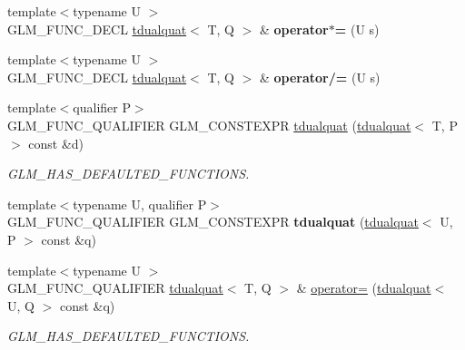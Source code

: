 \begin{DoxyCompactItemize}
{\footnotesize template$<$typename U $>$ }\\G\+L\+M\+\_\+\+F\+U\+N\+C\+\_\+\+D\+E\+CL \hyperlink{structglm_1_1tdualquat}{tdualquat}$<$ T, Q $>$ \& {\bfseries operator$\ast$=} (U s)
\item 
\mbox{\label{structglm_1_1tdualquat_a608f6681fbff3ab120235c75aac8805b}} 
{\footnotesize template$<$typename U $>$ }\\G\+L\+M\+\_\+\+F\+U\+N\+C\+\_\+\+D\+E\+CL \hyperlink{structglm_1_1tdualquat}{tdualquat}$<$ T, Q $>$ \& {\bfseries operator/=} (U s)
\item 
\mbox{\label{structglm_1_1tdualquat_a9dbf71289809c7b43527c0e881601fbb}} 
{\footnotesize template$<$qualifier P$>$ }\\G\+L\+M\+\_\+\+F\+U\+N\+C\+\_\+\+Q\+U\+A\+L\+I\+F\+I\+ER G\+L\+M\+\_\+\+C\+O\+N\+S\+T\+E\+X\+PR \hyperlink{structglm_1_1tdualquat_a9dbf71289809c7b43527c0e881601fbb}{tdualquat} (\hyperlink{structglm_1_1tdualquat}{tdualquat}$<$ T, P $>$ const \&d)
\begin{DoxyCompactList}\small\item\em G\+L\+M\+\_\+\+H\+A\+S\+\_\+\+D\+E\+F\+A\+U\+L\+T\+E\+D\+\_\+\+F\+U\+N\+C\+T\+I\+O\+NS. \end{DoxyCompactList}\item 
\mbox{\label{structglm_1_1tdualquat_a00f0899c1213aa991a65dfaf8d15fba5}} 
{\footnotesize template$<$typename U, qualifier P$>$ }\\G\+L\+M\+\_\+\+F\+U\+N\+C\+\_\+\+Q\+U\+A\+L\+I\+F\+I\+ER G\+L\+M\+\_\+\+C\+O\+N\+S\+T\+E\+X\+PR {\bfseries tdualquat} (\hyperlink{structglm_1_1tdualquat}{tdualquat}$<$ U, P $>$ const \&q)
\item 
\mbox{\label{structglm_1_1tdualquat_a6bdd31159c6bf9d7bca75971c2a1e512}} 
{\footnotesize template$<$typename U $>$ }\\G\+L\+M\+\_\+\+F\+U\+N\+C\+\_\+\+Q\+U\+A\+L\+I\+F\+I\+ER \hyperlink{structglm_1_1tdualquat}{tdualquat}$<$ T, Q $>$ \& \hyperlink{structglm_1_1tdualquat_a6bdd31159c6bf9d7bca75971c2a1e512}{operator=} (\hyperlink{structglm_1_1tdualquat}{tdualquat}$<$ U, Q $>$ const \&q)
\begin{DoxyCompactList}\small\item\em G\+L\+M\+\_\+\+H\+A\+S\+\_\+\+D\+E\+F\+A\+U\+L\+T\+E\+D\+\_\+\+F\+U\+N\+C\+T\+I\+O\+NS. \end{DoxyCompactList}\item 

\end{DoxyCompactItemize}
